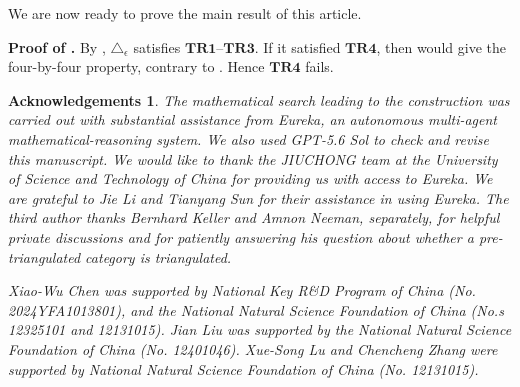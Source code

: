 \documentclass[a4paper,reqno,10pt]{amsart}
\numberwithin{equation}{section}
\newtheorem*{ack}{Acknowledgements}
\newcommand{\eps}{\epsilon}
\begin{document}
We are now ready to prove the main result of this article.

{\bf Proof of .} By ,
$\triangle_\eps$ satisfies $\mathbf{TR1}$--$\mathbf{TR3}$. If it satisfied
$\mathbf{TR4}$, then  would give the
four-by-four property, contrary to
. Hence $\mathbf{TR4}$ fails.

\begin{ack}
    The mathematical search leading to the construction was carried out with substantial assistance from Eureka, an autonomous multi-agent mathematical-reasoning system. We also used GPT-5.6 Sol to check and revise this manuscript. We would like to thank the JIUCHONG team at the University of Science and Technology of China for providing us with access to Eureka. We are grateful to Jie Li and Tianyang Sun for their assistance in using Eureka. The third author thanks Bernhard Keller and Amnon Neeman, separately, for helpful private discussions and for patiently answering his question about whether a pre-triangulated category is triangulated.

Xiao-Wu Chen was supported by 
National Key R\textup{\&}D Program of China (No. 2024YFA1013801), and
the National Natural Science Foundation of China (No.s 12325101 and 12131015). Jian Liu was supported by the National Natural Science Foundation of China (No. 12401046). Xue-Song Lu and Chencheng Zhang were supported by National Natural Science Foundation of China (No. 12131015).
\end{ack}
\end{document}
